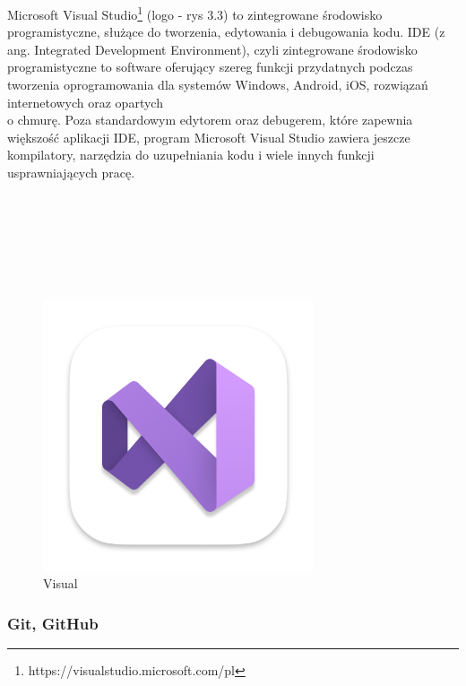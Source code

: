 \hspace*{0.60cm}Microsoft Visual Studio\footnote{ https://visualstudio.microsoft.com/pl} (logo - rys 3.3) to zintegrowane środowisko programistyczne, służące do tworzenia, edytowania i debugowania kodu. IDE (z ang. Integrated Development Environment), czyli zintegrowane środowisko programistyczne to software oferujący szereg funkcji przydatnych podczas tworzenia oprogramowania dla systemów Windows, Android, iOS, rozwiązań internetowych oraz opartych \\o chmurę. Poza standardowym edytorem oraz debugerem, które zapewnia większość aplikacji IDE, program Microsoft Visual Studio zawiera jeszcze kompilatory, narzędzia do uzupełniania kodu i wiele innych funkcji usprawniających pracę.
\\
\\
\\
\\
\\
\\
\\
	\begin{figure}[!htb]
	\begin{center}
		\includegraphics[width=8cm]{rys/visual.png}
		\caption{Visual}
		\label{rys:rysunek001}
	\end{center}
\end{figure}

\subsubsection{Git, GitHub}

